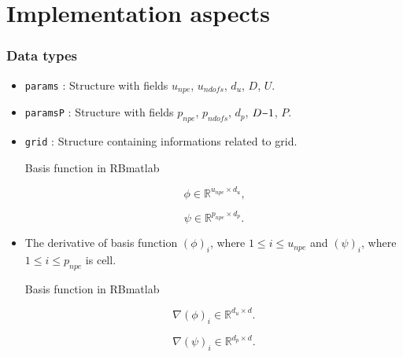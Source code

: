 \documentclass{beamer}
\newcommand{\minus}{\scalebox{0.75}[1.0]{$-$}}
\begin{document}
\section{Implementation aspects}


\begin{frame}
\frametitle{Data types}

\begin{itemize}
\item \texttt{params} : Structure with fields $u_{npe}$, $u_{ndofs}$, $d_u$, $D$, $U$.

\item \texttt{paramsP} : Structure with fields $p_{npe}$, $p_{ndofs}$, $d_p$, $D \minus 1$, $P$.

\item \texttt{grid} : Structure containing informations related to grid.

\begin{block}{Basis function in RBmatlab}

\begin{equation}\label{basis_func_velocity_rbmatlab}
\phi \in \mathbb{R}^{u_{npe} \times d_u} \textrm{,}
\end{equation}

\begin{equation}\label{basis_func_pressure_rbmatlab}
\psi \in \mathbb{R}^{p_{npe} \times d_p} \textrm{.}
\end{equation}
\end{block}

\item The derivative of basis function $(\phi)_{i}$, where $1 \leq i \leq u_{npe}$ and $(\psi)_{i}$, where $1 \leq i \leq p_{npe}$ is cell.

\begin{block}{Basis function in RBmatlab}

\begin{equation}\label{basis_func_derivative_velocity_rbmatlab}
\nabla (\phi)_{i} \in \mathbb{R}^{{d_u} \times d} \textrm{.}
\end{equation}

\begin{equation}\label{basis_func_derivative_pressure_rbmatlab}
\nabla (\psi)_{i} \in \mathbb{R}^{{d_p} \times d} \textrm{.}
\end{equation}

\end{block}

\end{itemize}

\end{frame}
\end{document}
